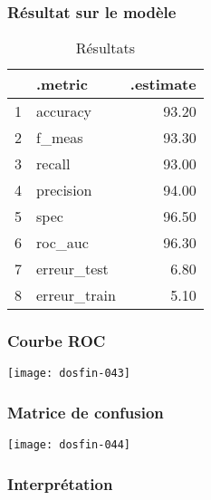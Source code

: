 \documentclass[a4paper,11pt]{article}
\begin{document}
\newpage

\subsubsection{Résultat sur le modèle}

\begin{center}


\begin{table}[ht]
\centering
\begin{tabular}{rlr}
  \hline
 & .metric & .estimate \\ 
  \hline
1 & accuracy & 93.20 \\ 
  2 & f\_meas & 93.30 \\ 
  3 & recall & 93.00 \\ 
  4 & precision & 94.00 \\ 
  5 & spec & 96.50 \\ 
  6 & roc\_auc & 96.30 \\ 
  7 & erreur\_test & 6.80 \\ 
  8 & erreur\_train & 5.10 \\ 
   \hline
\end{tabular}
\caption{Résultats} 
\end{table}
\end{center}

\subsubsection{Courbe ROC}

\begin{center}

\texttt{[image: dosfin-043]}

\end{center}

\subsubsection{Matrice de confusion}

\begin{center}

\texttt{[image: dosfin-044]}

\end{center}

\subsubsection{Interprétation}
\end{document}
